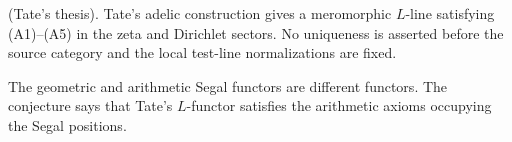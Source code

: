 \begin{theorem}
\label{v4-arith:thm:segal-tate-equivalence}
\ClaimStatusProvedElsewhere (Tate's thesis). Tate's adelic construction
gives a meromorphic \(L\)-line satisfying (A1)--(A5) in the zeta and
Dirichlet sectors. No uniqueness is asserted before the source category
and the local test-line normalizations are fixed.
\end{theorem}

The geometric and arithmetic Segal functors are different functors.
The conjecture says that Tate's \(L\)-functor satisfies the arithmetic
axioms occupying the Segal positions.
